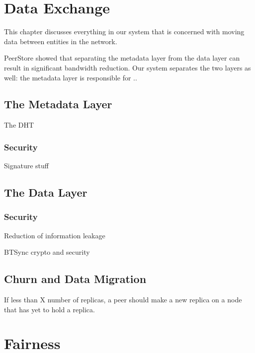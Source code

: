 \documentclass[12pt]{report}
\begin{document}
\section{Data Exchange}

This chapter discusses everything in our system that is concerned with moving data between entities in the network.

PeerStore showed that separating the metadata layer from the data layer can result in significant bandwidth reduction. Our system separates the two layers as well: the metadata layer is responsible for .. 

\subsection{The Metadata Layer}

The DHT

\subsubsection{Security}

Signature stuff

\subsection{The Data Layer}

\subsubsection{Security}

Reduction of information leakage

BTSync crypto and security

\subsection{Churn and Data Migration}

If less than X number of replicas, a peer should make a new replica on a node that has yet to hold a replica.


\section{Fairness} \label{sec:challenge}
\end{document}
